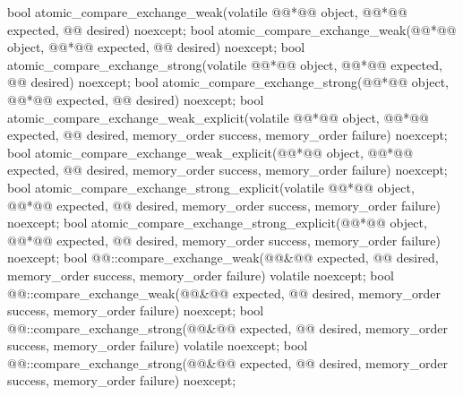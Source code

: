 %
%
%
%
%
%
\begin{itemdecl}
bool atomic_compare_exchange_weak(volatile @@*@\itcorr[-1]@ object, @@*@\itcorr[-1]@ expected, @@ desired) noexcept;
bool atomic_compare_exchange_weak(@@*@\itcorr[-1]@ object, @@*@\itcorr[-1]@ expected, @@ desired) noexcept;
bool atomic_compare_exchange_strong(volatile @@*@\itcorr[-1]@ object, @@*@\itcorr[-1]@ expected, @@ desired) noexcept;
bool atomic_compare_exchange_strong(@@*@\itcorr[-1]@ object, @@*@\itcorr[-1]@ expected, @@ desired) noexcept;
bool atomic_compare_exchange_weak_explicit(volatile @@*@\itcorr[-1]@ object, @@*@\itcorr[-1]@ expected, @@ desired,
    memory_order success, memory_order failure) noexcept;
bool atomic_compare_exchange_weak_explicit(@@*@\itcorr[-1]@ object, @@*@\itcorr[-1]@ expected, @@ desired,
    memory_order success, memory_order failure) noexcept;
bool atomic_compare_exchange_strong_explicit(volatile @@*@\itcorr[-1]@ object, @@*@\itcorr[-1]@ expected, @@ desired,
    memory_order success, memory_order failure) noexcept;
bool atomic_compare_exchange_strong_explicit(@@*@\itcorr[-1]@ object, @@*@\itcorr[-1]@ expected, @@ desired,
    memory_order success, memory_order failure) noexcept;
bool @@::compare_exchange_weak(@@&@\itcorr[-1]@ expected, @@ desired,
    memory_order success, memory_order failure) volatile noexcept;
bool @@::compare_exchange_weak(@@&@\itcorr[-1]@ expected, @@ desired,
    memory_order success, memory_order failure) noexcept;
bool @@::compare_exchange_strong(@@&@\itcorr[-1]@ expected, @@ desired,
    memory_order success, memory_order failure) volatile noexcept;
bool @@::compare_exchange_strong(@@&@\itcorr[-1]@ expected, @@ desired,
    memory_order success, memory_order failure) noexcept;

\end{itemdecl}
